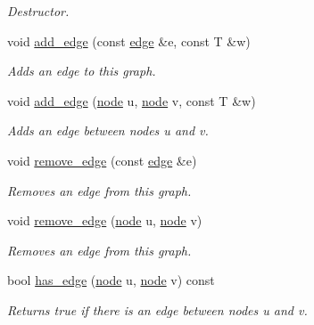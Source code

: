 \begin{DoxyCompactItemize}
\begin{DoxyCompactList}\small\item\em Destructor. \end{DoxyCompactList}\item 
void \hyperlink{classlgraph_1_1utils_1_1wugraph_a8e4db27ca594bc78cde948a7c9fa1f00}{add\+\_\+edge} (const \hyperlink{namespacelgraph_1_1utils_a6510284ce1b1ae5dc97ce5d2de426e10}{edge} \&e, const T \&w)
\begin{DoxyCompactList}\small\item\em Adds an edge to this graph. \end{DoxyCompactList}\item 
void \hyperlink{classlgraph_1_1utils_1_1wugraph_a64d5de79fb869156ba3a110a68d6ea3f}{add\+\_\+edge} (\hyperlink{namespacelgraph_1_1utils_a7bd66ede3805ef121bc2835bd48de0cf}{node} u, \hyperlink{namespacelgraph_1_1utils_a7bd66ede3805ef121bc2835bd48de0cf}{node} v, const T \&w)
\begin{DoxyCompactList}\small\item\em Adds an edge between nodes {\itshape u} and {\itshape v}. \end{DoxyCompactList}\item 
void \hyperlink{classlgraph_1_1utils_1_1wugraph_ad91246c2a9844d837ddb26e5abe563c6}{remove\+\_\+edge} (const \hyperlink{namespacelgraph_1_1utils_a6510284ce1b1ae5dc97ce5d2de426e10}{edge} \&e)
\begin{DoxyCompactList}\small\item\em Removes an edge from this graph. \end{DoxyCompactList}\item 
void \hyperlink{classlgraph_1_1utils_1_1wugraph_a8fd7f1a7ef76576a35e72687f4fdfce1}{remove\+\_\+edge} (\hyperlink{namespacelgraph_1_1utils_a7bd66ede3805ef121bc2835bd48de0cf}{node} u, \hyperlink{namespacelgraph_1_1utils_a7bd66ede3805ef121bc2835bd48de0cf}{node} v)
\begin{DoxyCompactList}\small\item\em Removes an edge from this graph. \end{DoxyCompactList}\item 
bool \hyperlink{classlgraph_1_1utils_1_1wugraph_a5d729aece87dbda408211b12ad4856d1}{has\+\_\+edge} (\hyperlink{namespacelgraph_1_1utils_a7bd66ede3805ef121bc2835bd48de0cf}{node} u, \hyperlink{namespacelgraph_1_1utils_a7bd66ede3805ef121bc2835bd48de0cf}{node} v) const 
\begin{DoxyCompactList}\small\item\em Returns true if there is an edge between nodes {\itshape u} and {\itshape v}. \end{DoxyCompactList}\item 

\end{DoxyCompactItemize}
